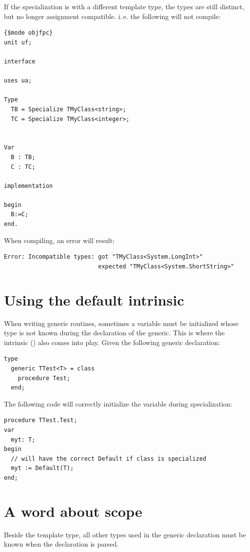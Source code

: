 If the specialization is with a different template type, the types are still distinct, but no longer assignment
compatible. i.\,e. the following will not compile:
\begin{verbatim}
{$mode objfpc}
unit uf;

interface

uses ua;

Type
  TB = Specialize TMyClass<string>;
  TC = Specialize TMyClass<integer>;


Var
  B : TB;
  C : TC;

implementation

begin
  B:=C;
end.
\end{verbatim}
When compiling, an error will result:
\begin{verbatim}
Error: Incompatible types: got "TMyClass<System.LongInt>"
                           expected "TMyClass<System.ShortString>"
\end{verbatim}

\section{Using the default intrinsic}
\label{se:genericdefault}
When writing generic routines, sometimes a variable must be initialized whose type is not known during the declaration of the generic.
This is where the  intrinsic () also comes into play. Given the following generic declaration:
\begin{verbatim}
type
  generic TTest<T> = class
    procedure Test;
  end;
\end{verbatim}
The following code will correctly initialize the variable  during specialization:
\begin{verbatim}
procedure TTest.Test;
var
  myt: T;
begin
  // will have the correct Default if class is specialized
  myt := Default(T);
end;
\end{verbatim}

\section{A word about scope}
Beside the template type, all other types used in the generic declaration must be
known when the declaration is parsed.

